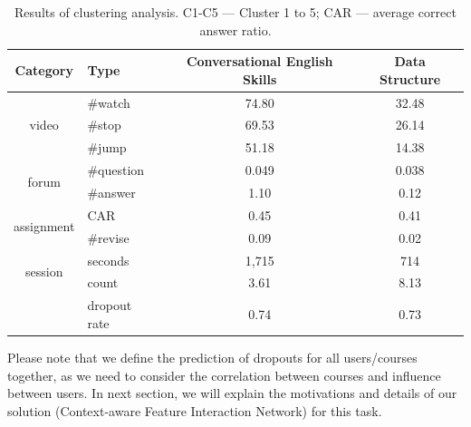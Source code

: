 	
  \begin{table}
	\hspace{-0.01in}
	\centering
	\caption{Results of clustering analysis. C1-C5 --- Cluster 1 to 5; CAR --- average correct answer ratio. }
	\small
	\label{tab:sample}
	\setlength{\tabcolsep}{1mm}\begin{tabular}{@{}c@{}|l@{}|c|c}
		\hline
		\hline
		Category &  Type   & Conversational English Skills & Data Structure \\
		\hline
		\multirow{3}{*}{video}&  \#watch &74.80 & 32.48\\	
		\cline{2-4}
		& \#stop     &69.53 & 26.14\\
		\cline{2-4}
		& \#jump   &51.18 & 14.38\\
		\hline
		\multirow{2}{*}{forum}&  \#question & 0.049 & 0.038 \\
		\cline{2-4}
		& \#answer &1.10&0.12 \\
		\hline
		\multirow{2}{*}{assignment} & CAR &0.45 & 0.41 \\
		\cline{2-4}
		& \#revise  &0.09& 0.02 \\
		\hline
		\multirow{2}{*}{session}    & seconds &1,715 &714 \\
		\cline{2-4}                
		&  count     &3.61 &8.13 \\  
		\hline
		& dropout rate &0.74 &0.73 \\
		\hline	
		\hline
	\end{tabular}
	\normalsize
\end{table}
Please note that we define the prediction of dropouts for all users/courses together, as we need to consider the correlation between courses and influence between users. In next section, we will explain the motivations and details of our solution (Context-aware Feature Interaction Network) for this task.


